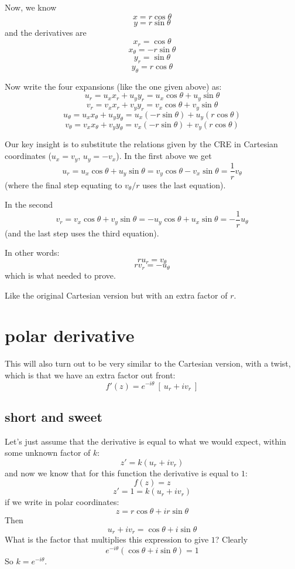\documentclass[11pt, oneside]{article}   	%
\begin{document}
Now, we know
\[ x = r \cos \theta \]
\[ y = r \sin \theta \]
and the derivatives are
\[ x_r = \cos \theta \]
\[ x_{\theta} = -r \sin \theta \]
\[ y_r = \sin \theta \]
\[ y_{\theta} = r \cos \theta \]

Now write the four expansions (like the one given above) as:
\[ u_r = u_x x_r + u_y y_r = u_x \cos \theta + u_y \sin \theta \]
\[ v_r = v_x x_r + v_y y_r = v_x \cos \theta + v_y \sin \theta \]
\[ u_{\theta} = u_x x_{\theta} + u_y y_{\theta} = u_x (-r \sin \theta) + u_y (r \cos \theta) \]
\[ v_{\theta} = v_x x_{\theta} + v_y y_{\theta} = v_x (-r \sin \theta) + v_y (r \cos \theta) \]

Our key insight is to substitute the relations given by the CRE in Cartesian coordinates ($u_x = v_y$, $u_y = - v_x$).  In the first above we get
\[ u_r = u_x \cos \theta + u_y \sin \theta = v_y \cos \theta - v_x \sin \theta = \frac{1}{r} v_{\theta} \]
(where the final step equating to $v_{\theta}/r$ uses the last equation).

In the second
\[ v_r = v_x \cos \theta + v_y \sin \theta = -u_y \cos \theta + u_x \sin \theta = - \frac{1}{r} u_{\theta} \]
(and the last step uses the third equation).

In other words:
\[ r u_r = v_{\theta} \]
\[ r v_r = - u_{\theta} \]
which is what needed to prove.

Like the original Cartesian version but with an extra factor of $r$.

\section*{polar derivative} 
This will also turn out to be very similar to the Cartesian version, with a twist, which is that we have an extra factor out front:
\[ f'(z) = e^{-i \theta} \ [ \ u_r + i v_r \ ] \]

\subsection*{short and sweet}
Let's just assume that the derivative is equal to what we would expect, within some unknown factor of $k$:
\[ z' = k(u_r + i v_r) \]
and now we know that for this function the derivative is equal to $1$:
\[ f(z) = z \]
\[ z' = 1 = k(u_r + i v_r) \]
if we write in polar coordinates:
\[ z = r \cos \theta + i r \sin \theta \]
Then 
\[ u_r + i v_r = \cos \theta + i \sin \theta \]
What is the factor that multiplies this expression to give $1$?
Clearly
\[ e^{- i \theta} (\cos \theta + i \sin \theta) = 1 \]
So $k = e^{- i \theta}$.
\end{document}
